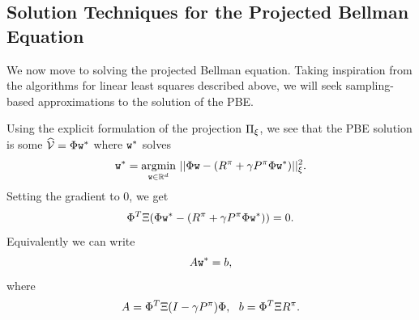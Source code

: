 \subsection{Solution Techniques for the Projected Bellman Equation}
We now move to solving the projected Bellman equation. Taking inspiration from the algorithms for linear least squares described above, we will seek sampling-based approximations to the solution of the PBE.

Using the explicit formulation of the projection $\Pi_\xi$, we see that the PBE solution is some $\widehat{\mathcal{V}} = \Phi {\tt w}^*$ where ${\tt w}^*$ solves
$${\tt w}^* = \underset{{{\tt w} \in \mathbb{R}^d}}{\operatorname{argmin}} \ ||\Phi {\tt w} - (R^\pi+\gamma P^\pi\Phi {\tt w}^*)||_\xi^2.$$
Setting the gradient to $0$, we get
$$\Phi^T \Xi (\Phi {\tt w}^* - (R^\pi+\gamma P^\pi \Phi {\tt w}^*)) = 0.$$
Equivalently we can write
$$A {\tt w}^* = b,$$
where
\begin{equation}\label{eq:A_b_TD}
A = \Phi^T \Xi(I-\gamma P^\pi) \Phi, \ \ b = \Phi^T\Xi R^\pi.
\end{equation}

